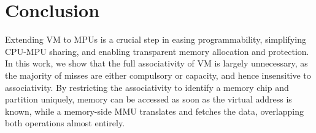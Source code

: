 \section{Conclusion}
\label{sec:conclusion}

Extending VM to MPUs is a crucial step in easing programmability, simplifying CPU-MPU sharing, and enabling transparent memory allocation and protection. In this work, we show that the full associativity of VM is largely unnecessary, as the majority of misses are either compulsory or capacity, and hence insensitive to associativity. By restricting the associativity to identify a memory chip and partition uniquely, memory can be accessed as soon as the virtual address is known, while a memory-side MMU translates and fetches the data, overlapping both operations almost entirely.




\newpage
